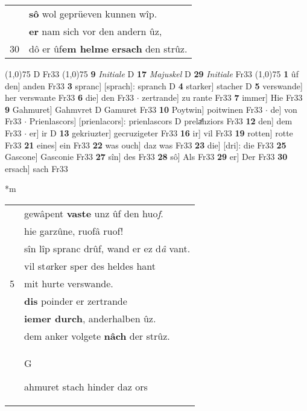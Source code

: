 \documentclass[8pt,a4paper,notitlepage]{article}
\begin{document}
\begin{table}[ht]
\begin{minipage}[t]{0.5\linewidth}
\begin{tabular}{rl}
 & \textbf{sô} wol geprüeven kunnen wîp.\\ 
 & \textbf{er} nam sich vor den andern ûz,\\ 
30 & dô er ûf\textbf{em helme} \textbf{ersach} den strûz.\\ 
\end{tabular}
\scriptsize
\line(1,0){75} \newline
D Fr33 \newline
\line(1,0){75} \newline
\textbf{9} \textit{Initiale} D  \textbf{17} \textit{Majuskel} D  \textbf{29} \textit{Initiale} Fr33  \newline
\line(1,0){75} \newline
\textbf{1} ûf den] anden Fr33 \textbf{3} spranc] [sprach]: spranch D \textbf{4} starker] stacher D \textbf{5} verswande] her verswante Fr33 \textbf{6} die] den Fr33  $\cdot$ zertrande] zu rante Fr33 \textbf{7} immer] Hie Fr33 \textbf{9} Gahmuret] Gahmvret D Gamuret Fr33 \textbf{10} Poytwin] poitwinen Fr33  $\cdot$ de] von Fr33  $\cdot$ Prienlascors] [prienlacors]: prienlascors D prelaͤhziors Fr33 \textbf{12} den] dem Fr33  $\cdot$ er] ir D \textbf{13} gekriuzter] gecruzigeter Fr33 \textbf{16} ir] vil Fr33 \textbf{19} rotten] rotte Fr33 \textbf{21} eines] ein Fr33 \textbf{22} was ouch] daz was Fr33 \textbf{23} die] [dri]: die Fr33 \textbf{25} Gascone] Gasconie Fr33 \textbf{27} sîn] des Fr33 \textbf{28} sô] Als Fr33 \textbf{29} er] Der Fr33 \textbf{30} ersach] sach Fr33 \newline
\end{minipage}
\hspace{0.5cm}
\begin{minipage}[t]{0.5\linewidth}
\small
\begin{center}*m
\end{center}
\begin{tabular}{rl}
 & gewâpent \textbf{vaste} unz ûf den huo\textit{f}.\\ 
 & hie garzûne, ruofâ ruof!\\ 
 & sîn lîp spranc drûf, wand er ez d\textit{â} vant.\\ 
 & vil st\textit{a}rker sper des heldes hant\\ 
5 & mit hurte verswande.\\ 
 & \textbf{dis} poinder er zertrande\\ 
 & \textbf{iemer durch}, anderhalben ûz.\\ 
 & dem anker volgete \textbf{nâch} der strûz.\\ 
 & \begin{large}G\end{large}ahmuret stach hinder daz ors\\ 

\end{tabular}
\end{minipage}
\end{table}
\end{document}
